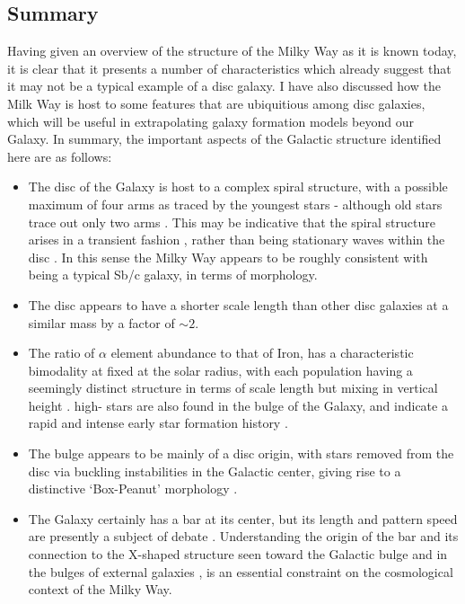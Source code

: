\subsection{Summary}
Having given an overview of the structure of the Milky Way as it is known today, it is clear that it presents a number of characteristics which already suggest that it may not be a typical example of a disc galaxy. I have also discussed how the Milk Way is host to some features that are ubiquitious among disc galaxies, which will be useful in extrapolating galaxy formation models beyond our Galaxy. In summary, the important aspects of the Galactic structure identified here are as follows:
\begin{itemize}
    \item The disc of the Galaxy is host to a complex spiral structure, with a possible maximum of four arms as traced by the youngest stars \citep[e.g.][]{2014MNRAS.437.1791U} - although old stars trace out only two arms \citep[e.g.][]{2000A&A...358L..13D}. This may be indicative that the spiral structure arises in a transient fashion \citep[e.g.][]{2011MNRAS.410.1637S}, rather than being stationary waves within the disc \citep[e.g.][]{1964ApJ...140..646L}. In this sense the Milky Way appears to be roughly consistent with being a typical Sb/c galaxy, in terms of morphology.
    \item The disc appears to have a shorter scale length than other disc galaxies at a similar mass \citep[e.g.][]{2010MNRAS.406.1595F} by a factor of $\sim 2$.
    \item The ratio of $\alpha$ element abundance to that of Iron, \afe{} has a characteristic bimodality at fixed \feh{} at the solar radius, with each population having a seemingly distinct structure in terms of scale length but mixing in vertical height \citep[e.g.][]{2012ApJ...751..131B,2012ApJ...753..148B,2016ApJ...823...30B}. high-\afe{} stars are also found in the bulge of the Galaxy, and indicate a rapid and intense early star formation history \citep[e.g.][]{2017arXiv170202971B}.
    \item The bulge appears to be mainly of a disc origin, with stars removed from the disc via buckling instabilities in the Galactic center, giving rise to a distinctive `Box-Peanut' morphology \citep[e.g.][]{2005MNRAS.358.1477A}.
    \item The Galaxy certainly has a bar at its center, but its length and pattern speed are presently a subject of debate \citep[e.g.][]{2000AJ....119..800D,2015MNRAS.450.4050W}. Understanding the origin of the bar and its connection to the X-shaped structure seen toward the Galactic bulge \citep[e.g.][]{2016AJ....152...14N} and in the bulges of external galaxies \citep{2006MNRAS.370..753B}, is an essential constraint on the cosmological context of the Milky Way.

\end{itemize}
